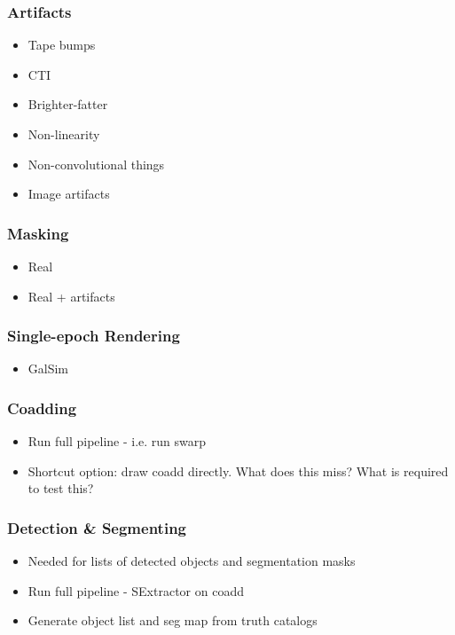\documentclass[\docopts]{\docclass}
\begin{document}
\subsubsection{Artifacts}
\begin{itemize}
\item Tape bumps
\item CTI
\item Brighter-fatter
\item Non-linearity
\item Non-convolutional things
\item Image artifacts
\end{itemize}

\subsubsection{Masking}

\begin{itemize}
\item Real
\item Real + artifacts
\end{itemize}

\subsubsection{Single-epoch Rendering}

\begin{itemize}
\item GalSim
\end{itemize}

\subsubsection{Coadding}
\begin{itemize}
\item Run full pipeline - i.e. run swarp
\item Shortcut option: draw coadd directly. What does this miss? What is required to test this?
\end{itemize}

\subsubsection{Detection \& Segmenting}
\begin{itemize}
\item Needed for lists of detected objects and segmentation masks
\item Run full pipeline - SExtractor on coadd
\item Generate object list and seg map from truth catalogs
\end{itemize}
\end{document}
